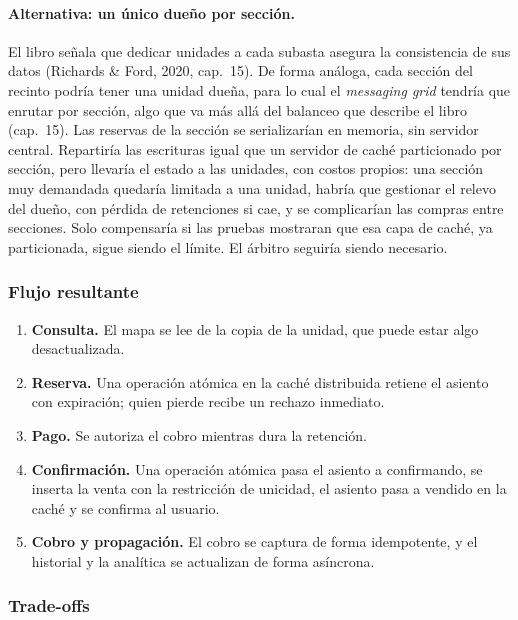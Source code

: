 \paragraph{Alternativa: un único dueño por sección.}
El libro señala que dedicar unidades a cada subasta asegura la consistencia de sus
datos (Richards \& Ford, 2020, cap.~15). De forma análoga, cada sección del recinto
podría tener una unidad dueña, para lo cual el \emph{messaging grid} tendría que
enrutar por sección, algo que va más allá del balanceo que describe el libro (cap.~15).
Las reservas de la sección se serializarían en memoria, sin servidor central.
Repartiría las escrituras igual que un servidor de caché particionado por sección, pero
llevaría el estado a las unidades, con costos propios: una sección muy demandada
quedaría limitada a una unidad, habría que gestionar el relevo del dueño, con pérdida
de retenciones si cae, y se complicarían las compras entre secciones. Solo compensaría
si las pruebas mostraran que esa capa de caché, ya particionada, sigue siendo el
límite. El árbitro seguiría siendo necesario.

\subsubsection{Flujo resultante}

\begin{enumerate}
  \item \textbf{Consulta.} El mapa se lee de la copia de la unidad, que puede estar algo
    desactualizada.
  \item \textbf{Reserva.} Una operación atómica en la caché distribuida retiene el
    asiento con expiración; quien pierde recibe un rechazo inmediato.
  \item \textbf{Pago.} Se autoriza el cobro mientras dura la retención.
  \item \textbf{Confirmación.} Una operación atómica pasa el asiento a confirmando, se
    inserta la venta con la restricción de unicidad, el asiento pasa a vendido en la
    caché y se confirma al usuario.
  \item \textbf{Cobro y propagación.} El cobro se captura de forma idempotente, y el
    historial y la analítica se actualizan de forma asíncrona.
\end{enumerate}

\subsubsection{Trade-offs}

